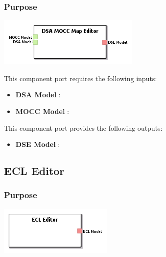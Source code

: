 \documentclass{gemoc} %
\begin{document}

\subsubsection{Purpose}


\begin{center}
\includegraphics*[trim=0.0cm 0.0cm 0cm 0.0cm, clip=true]{../images/generated/Generated_DSA-MOCC_Map_Editor.png}
\end{center}

This component port requires the following inputs:
\begin{itemize}
  \item \textbf{DSA Model} :
  \item \textbf{MOCC Model} :
\end{itemize}

This component port provides the following outputs:
\begin{itemize}
  \item \textbf{DSE Model} :
\end{itemize}


\subsection{ECL Editor}


\subsubsection{Purpose}


\begin{center}
\includegraphics*[trim=0.0cm 0.0cm 0cm 0.0cm, clip=true]{../images/generated/Generated_ECL_Editor.png}
\end{center}
\end{document}
